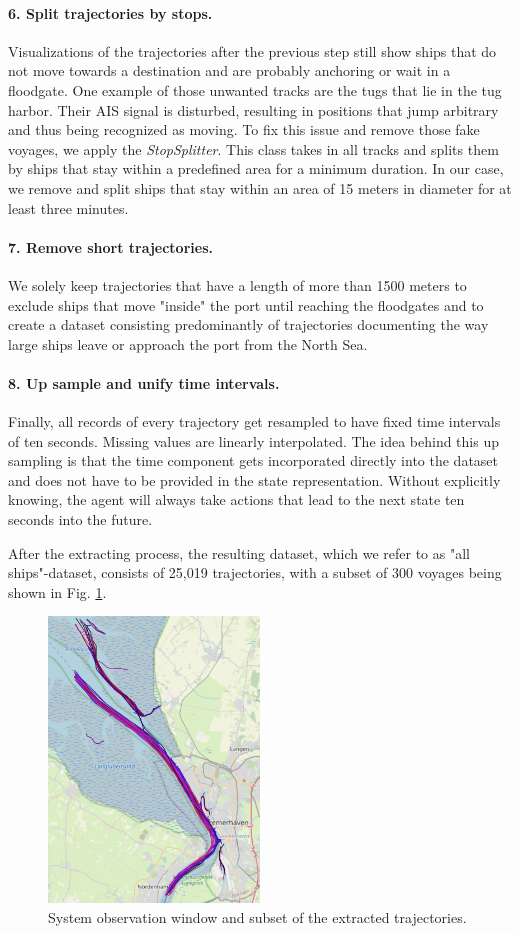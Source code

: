 \paragraph{6. Split trajectories by stops.}
Visualizations of the trajectories after the previous step still show ships that do not move towards a destination and are probably anchoring or wait in a floodgate. One example of those unwanted tracks are the tugs that lie in the tug harbor. Their AIS signal is disturbed, resulting in positions that jump arbitrary and thus being recognized as moving. To fix this issue and remove those fake voyages, we apply the \textit{StopSplitter}. This class takes in all tracks and splits them by ships that stay within a predefined area for a minimum duration. In our case, we remove and split ships that stay within an area of 15 meters in diameter for at least three minutes.


\paragraph{7. Remove short trajectories.}
We solely keep trajectories that have a length of more than 1500 meters to  exclude ships that move "inside" the port until reaching the floodgates and to create a dataset consisting predominantly of trajectories documenting the way large ships leave or approach the port from the North Sea.

\paragraph{8. Up sample and unify time intervals.}
Finally, all records of every trajectory get resampled to have fixed time intervals of ten seconds. Missing values are linearly interpolated. The idea behind this up sampling is that the time component gets incorporated directly into the dataset and does not have to be provided in the state representation. Without explicitly knowing, the agent will always take actions that lead to the next state ten seconds into the future.
\par

After the extracting process, the resulting dataset, which we refer to as "all ships"-dataset, consists of 25,019 trajectories, with a subset of 300 voyages being shown in Fig. \ref{fig:tracks}.

\begin{figure}[H]
    \centering
    \includegraphics[width=0.5\textwidth]{images/ais/tracks/all_ships.png}
    \caption{System observation window and subset of the extracted trajectories.}
    \label{fig:tracks}
\end{figure}